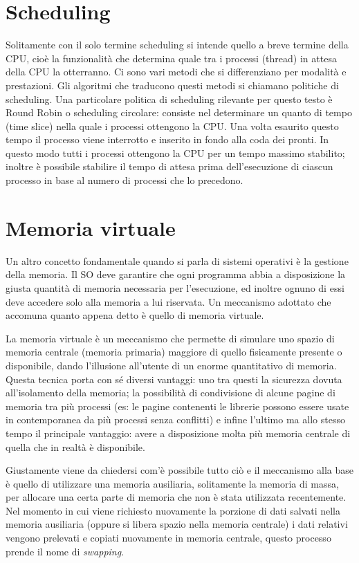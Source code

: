 \section{Scheduling}
Solitamente con il solo termine scheduling si intende quello a breve termine della CPU, cioè la funzionalità che determina quale tra i processi (thread) in attesa della CPU la otterranno. Ci sono vari metodi che si differenziano per modalità e prestazioni. Gli algoritmi che traducono questi metodi si chiamano politiche di scheduling.
Una particolare politica di scheduling rilevante per questo testo è Round Robin o scheduling circolare: consiste nel determinare un quanto di tempo (time slice) nella quale i processi ottengono la CPU. Una volta esaurito questo tempo il processo viene interrotto e inserito in fondo alla coda dei pronti. In questo modo tutti i processi ottengono la CPU per un tempo massimo stabilito; inoltre è possibile stabilire il tempo di attesa prima dell'esecuzione di ciascun processo in base al numero di processi che lo precedono.

\section{Memoria virtuale}
Un altro concetto fondamentale quando si parla di sistemi operativi è la gestione della memoria. Il SO deve garantire che ogni programma abbia a disposizione la giusta quantità di memoria necessaria per l'esecuzione, ed inoltre ognuno di essi deve accedere solo alla memoria a lui riservata. Un meccanismo adottato che accomuna quanto appena detto è quello di memoria virtuale.

La memoria virtuale è un meccanismo che permette di simulare uno spazio di memoria centrale (memoria primaria) maggiore di quello fisicamente presente o disponibile, dando l'illusione all'utente di un enorme quantitativo di memoria. Questa tecnica porta con sé diversi vantaggi: uno tra questi la sicurezza dovuta all'isolamento della memoria; la possibilità di condivisione di alcune pagine di memoria tra più processi (es: le pagine contenenti le librerie possono essere usate in contemporanea da più processi senza conflitti) e infine l'ultimo ma allo stesso tempo il principale vantaggio: avere a disposizione molta più memoria centrale di quella che in realtà è disponibile. 

Giustamente viene da chiedersi com'è possibile tutto ciò e il meccanismo alla base è quello di utilizzare una memoria ausiliaria, solitamente la memoria di massa, per allocare una certa parte di memoria che non è stata utilizzata recentemente. Nel momento in cui viene richiesto nuovamente la porzione di dati salvati nella memoria ausiliaria (oppure si libera spazio nella memoria centrale) i dati relativi vengono prelevati e copiati nuovamente in memoria centrale, questo processo prende il nome di \textit{swapping}. 

